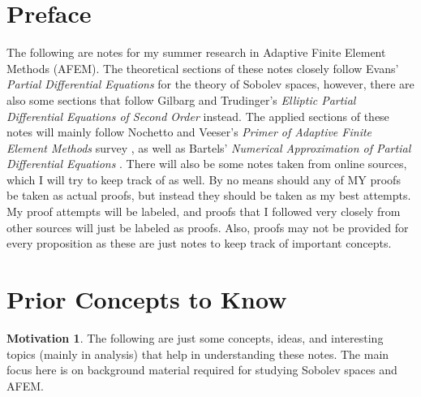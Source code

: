 \documentclass[11pt]{article}
\makeatletter
\theoremstyle{definition}
\newtheorem*{motivation}{Motivation}
\newcommand\frontmatter{%
    \cleardoublepage
  \pagenumbering{roman}}
\newcommand\mainmatter{%
    \cleardoublepage
  \pagenumbering{arabic}}
\makeatother
\begin{document}
\frontmatter
\pagestyle{fancy}
\fancyhead[L]{}
\fancyhead[R]{}

\tableofcontents
\newpage

\section*{Preface}
%
The following are notes for my summer research in Adaptive Finite Element Methods (AFEM).
The theoretical sections of these notes closely follow Evans' \textit{Partial Differential Equations} \cite{evans1998partial} for the theory of Sobolev spaces, however,
there are also some sections that follow Gilbarg and Trudinger's \textit{Elliptic Partial Differential Equations of Second Order} \cite{gilbarg2001elliptic} instead.
The applied sections of these notes will mainly follow Nochetto and Veeser's \textit{Primer of Adaptive Finite Element Methods} survey \cite{Nochetto2012},
as well as Bartels'
\textit{Numerical Approximation of Partial Differential Equations} \cite{bartels2016numerical}.
There will also be some notes taken from online sources, which I will try to keep track of as well.
By no means should any of MY proofs be taken as actual proofs, but instead they should be taken as my best attempts.
My proof attempts will be labeled, and proofs that I followed very closely from other sources will just be labeled as proofs.
Also, proofs may not be provided for every proposition as these are just notes to keep track of important concepts.

\fancyhead[L]{\leftmark}
\fancyhead[R]{\rightmark}
\fancyhead[C]{}
\newpage
\mainmatter

\section{Prior Concepts to Know}
\begin{motivation}
The following are just some concepts, ideas, and interesting topics (mainly in analysis) that help in understanding these notes.
The main focus here is on background material required for studying Sobolev spaces and AFEM.
\end{motivation}
\end{document}

